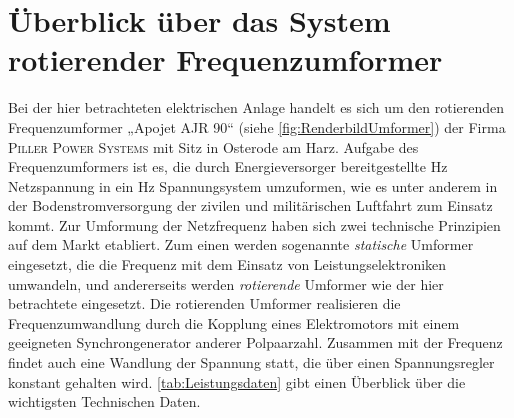 \section{Überblick über das System rotierender Frequenzumformer}
\label{sec:Uberblick}
Bei der hier betrachteten elektrischen Anlage handelt es sich um den rotierenden Frequenzumformer „Apojet AJR 90“ (siehe \cref{fig:RenderbildUmformer}) der Firma \textsc{Piller Power Systems} mit Sitz in Osterode am Harz. Aufgabe des Frequenzumformers ist es, die durch Energieversorger bereitgestellte \unit[50]{Hz} Netzspannung in ein \unit[400]{Hz} Spannungsystem umzuformen, wie es unter anderem in der Bodenstromversorgung der zivilen und militärischen Luftfahrt zum Einsatz kommt.
Zur Umformung der Netzfrequenz haben sich zwei technische Prinzipien auf dem Markt etabliert. Zum einen werden sogenannte \emph{statische} Umformer eingesetzt, die die Frequenz mit dem Einsatz von Leistungselektroniken umwandeln, und andererseits werden \emph{rotierende} Umformer wie der hier betrachtete eingesetzt. Die rotierenden Umformer realisieren die Frequenzumwandlung durch die Kopplung eines Elektromotors mit einem geeigneten Synchrongenerator anderer Polpaarzahl. Zusammen mit der Frequenz findet auch eine Wandlung der Spannung statt, die über einen Spannungsregler konstant gehalten wird. \cref{tab:Leistungsdaten} gibt einen Überblick über die wichtigsten Technischen Daten.

